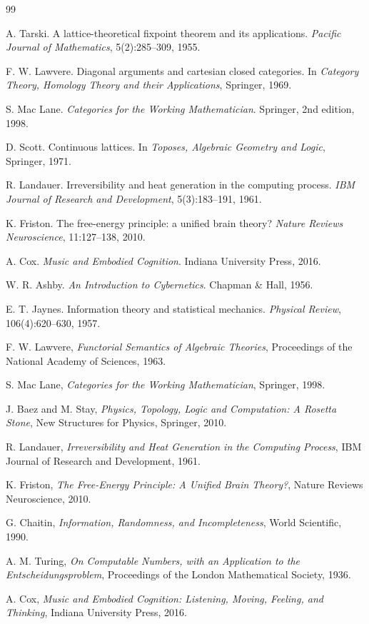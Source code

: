 \documentclass[12pt]{article}
\theoremstyle{remark}
\begin{document}
\begin{thebibliography}{99}

A. Tarski.
\newblock A lattice-theoretical fixpoint theorem and its applications.
\newblock \emph{Pacific Journal of Mathematics}, 5(2):285--309, 1955.

F. W. Lawvere.
\newblock Diagonal arguments and cartesian closed categories.
\newblock In \emph{Category Theory, Homology Theory and their Applications}, Springer, 1969.

S. Mac Lane.
\newblock \emph{Categories for the Working Mathematician}.
\newblock Springer, 2nd edition, 1998.

D. Scott.
\newblock Continuous lattices.
\newblock In \emph{Toposes, Algebraic Geometry and Logic}, Springer, 1971.

R. Landauer.
\newblock Irreversibility and heat generation in the computing process.
\newblock \emph{IBM Journal of Research and Development}, 5(3):183--191, 1961.

K. Friston.
\newblock The free-energy principle: a unified brain theory?
\newblock \emph{Nature Reviews Neuroscience}, 11:127--138, 2010.

A. Cox.
\newblock \emph{Music and Embodied Cognition}.
\newblock Indiana University Press, 2016.

W. R. Ashby.
\newblock \emph{An Introduction to Cybernetics}.
\newblock Chapman \& Hall, 1956.

E. T. Jaynes.
\newblock Information theory and statistical mechanics.
\newblock \emph{Physical Review}, 106(4):620--630, 1957.

F. W. Lawvere, \emph{Functorial Semantics of Algebraic Theories}, Proceedings of the National Academy of Sciences, 1963.

S. Mac Lane, \emph{Categories for the Working Mathematician}, Springer, 1998.

J. Baez and M. Stay, \emph{Physics, Topology, Logic and Computation: A Rosetta Stone}, New Structures for Physics, Springer, 2010.

R. Landauer, \emph{Irreversibility and Heat Generation in the Computing Process}, IBM Journal of Research and Development, 1961.

K. Friston, \emph{The Free-Energy Principle: A Unified Brain Theory?}, Nature Reviews Neuroscience, 2010.

G. Chaitin, \emph{Information, Randomness, and Incompleteness}, World Scientific, 1990.

A. M. Turing, \emph{On Computable Numbers, with an Application to the Entscheidungsproblem}, Proceedings of the London Mathematical Society, 1936.

A. Cox, \emph{Music and Embodied Cognition: Listening, Moving, Feeling, and Thinking}, Indiana University Press, 2016.

\end{thebibliography}
\end{document}
